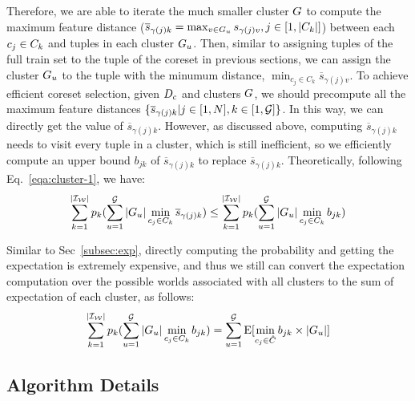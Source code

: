 Therefore,  we are able to iterate the much smaller cluster $G$ to compute  the maximum feature distance (\ie $\overline{s}_{\gamma(j)k} = \max_{v \in G_u}s_{\gamma(j)v}, j \in [1,|C_k|]$) between each $c_j \in C_k$ and tuples in each cluster $G_u$. Then, similar to assigning tuples of the full train set to the tuple of the coreset in previous sections, we can assign the cluster $G_u$ to the tuple  with the minumum distance, \ie $\min_{c_j\in C_k} \overline{s}_{\gamma(j)v}$. To achieve efficient coreset selection, given $D_c$ and clusters $G$, we should precompute all the maximum feature distances $\{\overline{s}_{\gamma(j)k}|j \in [1,N], k \in [1,\mathcal{G}]\}$. In this way, we can directly get the value of $\overline{s}_{\gamma(j)k}$. However, as discussed above, computing $\overline{s}_{\gamma(j)k}$ needs to visit every tuple in a cluster, which is still inefficient, so we  efficiently compute an upper bound $b_{jk}$ of  $\overline{s}_{\gamma(j)k}$ to replace $\overline{s}_{\gamma(j)k}$. Theoretically, following Eq.~\ref{eqa:cluster-1}, we have:
\vspace{-0.5em}
\begin{equation}\label{eqa:cluster-3}
    \begin{aligned}
        \sum_{k= 1}^{|\mathcal{I_W}|} p_k (\sum_{u=1}^{\mathcal{G}} |G_u| \min_{c_j\in C_k} \overline{s}_{\gamma(j)k}) \leq \sum_{k= 1}^{|\mathcal{I_W}|} p_k (\sum_{u=1}^{\mathcal{G}} |G_u| \min_{c_j\in C_k} b_{jk})
    \end{aligned}
\end{equation}

Similar to Sec~\ref{subsec:exp}, directly computing the probability and getting the expectation is extremely expensive, and thus we still can convert the expectation computation over the possible worlds associated with all clusters to the sum of expectation of each cluster, as follows:
\vspace{-0.5em}
\begin{equation}\label{eqa:cluster-4}
    \begin{aligned}
        \sum_{k= 1}^{|\mathcal{I_W}|} p_k (\sum_{u=1}^{\mathcal{G}} |G_u| \min_{c_j\in C_k} b_{jk}) = \sum_{u=1}^{\mathcal{G}} \mathrm{E}[\min_{c_j\in \hat{C}}b_{jk} \times |G_u|]
    \end{aligned}
\end{equation}

\subsection{Algorithm Details}


